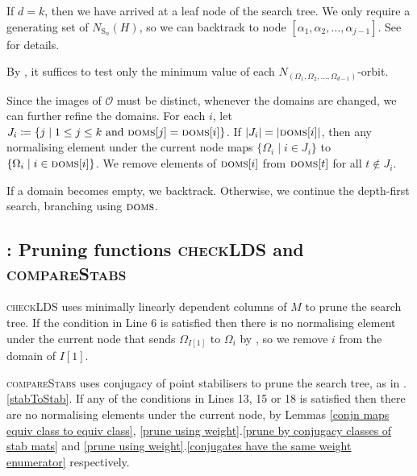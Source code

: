 \documentclass[11pt,a4paper]{article}
\theoremstyle{definition}
\theoremstyle{remark}
\newcommand{\Sy}{\mathrm{S}}
\begin{document}
\begin{description}\setlength{\itemsep}{0pt}
\item [Lines 2--7] If $d=k$, then we have arrived at a leaf node of the search tree. 
We only require a generating set of $N_{\Sy_n}(H)$, so we can backtrack to node $[\alpha_1, \alpha_2, \ldots, \alpha_{j-1}]$. See \cite[\S9.1.1]{seress} for details. 

\item [Line 9] By \cite[\S9.1.1]{seress}, it suffices to test only the minimum value of each $N_{(\Omega_1, \Omega_2, \ldots, \Omega_{d-1})}$-orbit. 

\item [Line 23] 
Since the images of $\mathcal{O}$ must be distinct, whenever the domains are changed, we can  further refine the domains. For each $i$, let $J_i  \coloneqq  \{ j\mid 1 \leq j \leq {k} \text{ and } \textsc{doms}[j] = \textsc{doms}[i] \} $.
If $|J_i| = |\textsc{doms}[i]|$, then any normalising element under the current node maps $\{\Omega_i \mid i \in J_i \}$ to $\{\Omega_i \mid i \in \textsc{doms}[i] \}$. 
We remove elements of $\textsc{doms}[i]$ from $\textsc{doms}[t]$ for all $t \not \in J_i$. 

\item [Lines 24--25] If a domain becomes empty, we backtrack. Otherwise, we continue the depth-first search, branching using $\textsc{doms}$. 
\end{description}

\subsection*{: Pruning functions \textsc{checkLDS} and \textsc{compareStabs}}

\textsc{checkLDS} uses minimally linearly dependent columns of $M$ to prune the search tree. If the condition in Line 6 is satisfied then there is no normalising element under the current node that sends $\Omega_{I[1]}$ to $\Omega_i$ by , so we remove $i$ from the domain of $I[1]$.  

\textsc{compareStabs} uses conjugacy of point stabilisers to prune the search tree, as in .\ref{stabToStab}. If any of the conditions in Lines 13, 15 or 18 is satisfied then there are no normalising elements under the current node, by  Lemmas \ref{conjn maps equiv class to equiv class}, \ref{prune using weight}.\ref{prune by conjugacy classes of stab mats} and \ref{prune using weight}.\ref{conjugates have the same weight enumerator} respectively.
\end{document}
